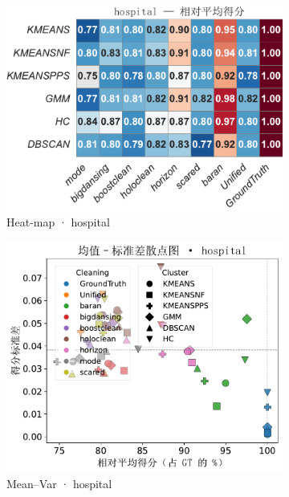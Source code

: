 \documentclass[10pt]{article} %
\numberwithin{equation}{section}
\begin{document}
\begin{figure}[htbp]
  \vspace{0.6em}
  \begin{subfigure}{0.33\linewidth}
    \centering
    \includegraphics[width=\linewidth]{figures/5.3.1graph/heatmap_rel_hospital.pdf}
    \caption{Heat-map · hospital}
  \end{subfigure}\hfill
  \begin{subfigure}{0.32\linewidth}
    \centering
    \includegraphics[width=\linewidth]{figures/5.3.1graph/mean_sd_scatter_hospital.pdf}
    \caption{Mean–Var · hospital}
  \end{subfigure}\hfill
  \begin{subfigure}{0.34\linewidth}

\end{subfigure}
\end{figure}
\end{document}
